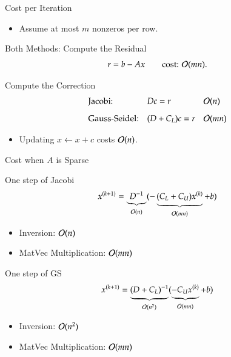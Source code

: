 \documentclass[10pt]{beamer}
\begin{document}


\begin{frame}{Cost per Iteration}

\begin{itemize}
    \item Assume at most $m$ nonzeros per row.
\end{itemize}

\begin{block}{Both Methods: Compute the Residual}
\[
    r=b-Ax
    \qquad \text{cost: }{\mathcal{O}}(mn).
\]
\end{block}

\begin{block}{Compute the Correction}
\[
\begin{array}{lll}
    \text{Jacobi:} & Dc=r
        & {\mathcal{O}}(n)\\[3mm]
    \text{Gauss-Seidel:} & (D+C_L)c=r
        & {\mathcal{O}}(mn)
\end{array}
\]
\end{block}

\begin{itemize}
    \item Updating $x\leftarrow x+c$ costs ${\mathcal{O}}(n)$.
\end{itemize}


\end{frame}


\begin{frame}{Cost when $A$ is Sparse}

\begin{block}{One step of Jacobi}
        \begin{align*}
        x^{(k+1)} =\underbrace{ D^{-1}}_{{\mathcal{O}}(n)}(-\underbrace{(C_L + C_U)x^{(k)}}_{{\mathcal{O}}(mn)}+b) 
    \end{align*}
    \begin{itemize}
        \item Inversion: ${\mathcal{O}}(n)$
        \item MatVec Multiplication: ${\mathcal{O}}(mn)$
    \end{itemize}
\end{block}

\begin{block}{One step of GS}
        \begin{align*}
        x^{(k+1)} = \underbrace{(D+C_L)^{-1}}_{{\mathcal{O}}(n^2)}(\underbrace{-C_U x^{(k)}}_{{\mathcal{O}}(mn)}+b)
    \end{align*}
        \begin{itemize}
        \item Inversion: ${\mathcal{O}}(n^2)$
        \item MatVec Multiplication: ${\mathcal{O}}(mn)$
    \end{itemize}
\end{block}
    
\end{frame}
\end{document}
